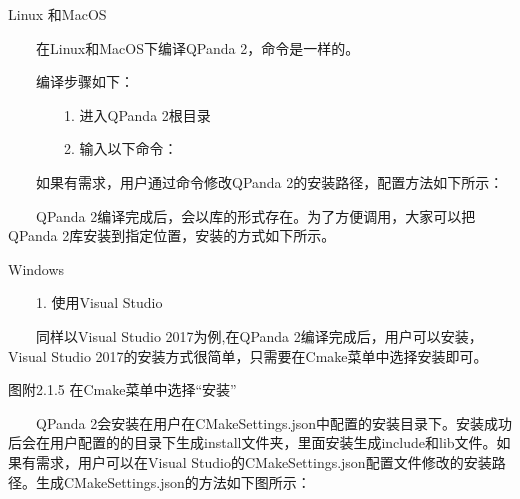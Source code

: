\documentclass[a4paper,11pt,english]{sphinxmanual}
\begin{document}
\sphinxAtStartPar
Linux 和MacOS

\sphinxAtStartPar
​  在Linux和MacOS下编译QPanda 2，命令是一样的。

\sphinxAtStartPar
​  编译步骤如下：

\sphinxAtStartPar
    1. 进入QPanda 2根目录

\sphinxAtStartPar
    2. 输入以下命令：

\begin{sphinxVerbatim}[commandchars=\\\{\}]
  
 
 
\end{sphinxVerbatim}

\sphinxAtStartPar
​  如果有需求，用户通过命令修改QPanda 2的安装路径，配置方法如下所示：

\begin{sphinxVerbatim}[commandchars=\\\{\}]
  
 
  
\end{sphinxVerbatim}

\sphinxAtStartPar
{}

\sphinxAtStartPar
​  QPanda 2编译完成后，会以库的形式存在。为了方便调用，大家可以把QPanda 2库安装到指定位置，安装的方式如下所示。

\sphinxAtStartPar
Windows

\sphinxAtStartPar
  1. 使用Visual Studio

\sphinxAtStartPar
​  同样以Visual Studio 2017为例,在QPanda 2编译完成后，用户可以安装，Visual Studio 2017的安装方式很简单，只需要在Cmake菜单中选择安装即可。


\begin{center}图附2.1.5 在Cmake菜单中选择“安装”
\end{center}
\sphinxAtStartPar
​  QPanda 2会安装在用户在CMakeSettings.json中配置的安装目录下。安装成功后会在用户配置的的目录下生成install文件夹，里面安装生成include和lib文件。如果有需求，用户可以在Visual Studio的CMakeSettings.json配置文件修改的安装路径。生成CMakeSettings.json的方法如下图所示：
\end{document}
